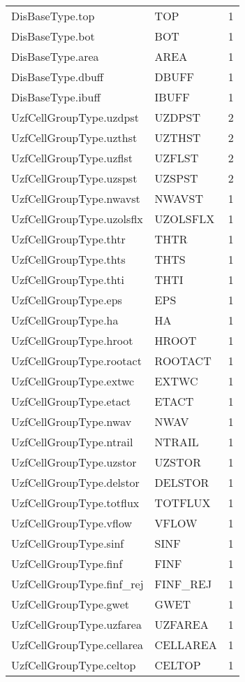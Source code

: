\begin{longtable}{p{6cm} p{4cm} p{2cm} }
DisBaseType.top &  TOP & 1 \\ 
DisBaseType.bot &  BOT & 1 \\ 
DisBaseType.area &  AREA & 1 \\ 
DisBaseType.dbuff &  DBUFF & 1 \\ 
DisBaseType.ibuff &  IBUFF & 1 \\ 
UzfCellGroupType.uzdpst &  UZDPST & 2 \\ 
UzfCellGroupType.uzthst &  UZTHST & 2 \\ 
UzfCellGroupType.uzflst &  UZFLST & 2 \\ 
UzfCellGroupType.uzspst &  UZSPST & 2 \\ 
UzfCellGroupType.nwavst &  NWAVST & 1 \\ 
UzfCellGroupType.uzolsflx &  UZOLSFLX & 1 \\ 
UzfCellGroupType.thtr &  THTR & 1 \\ 
UzfCellGroupType.thts &  THTS & 1 \\ 
UzfCellGroupType.thti &  THTI & 1 \\ 
UzfCellGroupType.eps &  EPS & 1 \\ 
UzfCellGroupType.ha &  HA & 1 \\ 
UzfCellGroupType.hroot &  HROOT & 1 \\ 
UzfCellGroupType.rootact &  ROOTACT & 1 \\ 
UzfCellGroupType.extwc &  EXTWC & 1 \\ 
UzfCellGroupType.etact &  ETACT & 1 \\ 
UzfCellGroupType.nwav &  NWAV & 1 \\ 
UzfCellGroupType.ntrail &  NTRAIL & 1 \\ 
UzfCellGroupType.uzstor &  UZSTOR & 1 \\ 
UzfCellGroupType.delstor &  DELSTOR & 1 \\ 
UzfCellGroupType.totflux &  TOTFLUX & 1 \\ 
UzfCellGroupType.vflow &  VFLOW & 1 \\ 
UzfCellGroupType.sinf &  SINF & 1 \\ 
UzfCellGroupType.finf &  FINF & 1 \\ 
UzfCellGroupType.finf\_rej &  FINF\_REJ & 1 \\ 
UzfCellGroupType.gwet &  GWET & 1 \\ 
UzfCellGroupType.uzfarea &  UZFAREA & 1 \\ 
UzfCellGroupType.cellarea &  CELLAREA & 1 \\ 
UzfCellGroupType.celtop &  CELTOP & 1 \\ 

\end{longtable}
